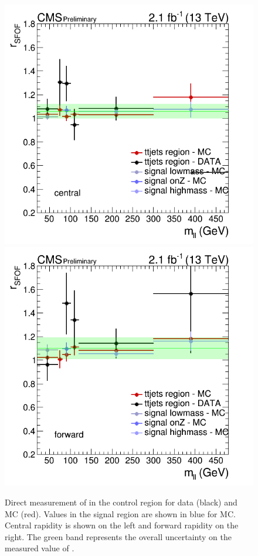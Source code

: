 \begin{figure}[h]
  \begin{center}
    \includegraphics[scale=0.35]{bkgd/figs/plot_rsfof_mll_central.png}
    \includegraphics[scale=0.35]{bkgd/figs/plot_rsfof_mll_forward.png}
    \caption{
      Direct measurement of \rsfof in the control region for data (black) and \ttbar MC (red).
      Values in the signal region are shown in blue for \ttbar MC. Central rapidity is shown on the left and forward rapidity on the right.
      The green band represents the overall uncertainty on the measured value of \rsfof.
    }
    \label{fig:rsfof}
  \end{center}
\end{figure}

